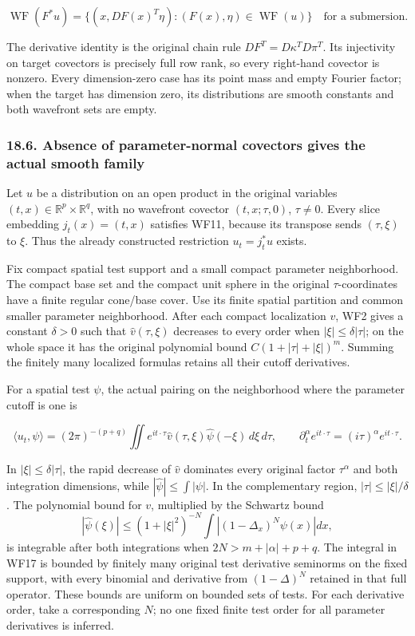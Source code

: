 \documentclass[
  11pt,
]{article}
\begin{document}
\[
\operatorname{WF}(F^*u)
 =\{(x,DF(x)^T\eta):(F(x),\eta)\in\operatorname{WF}(u)\}
 \quad\text{for a submersion}.
\tag{WF15}
\]

The derivative identity is the original chain rule
\(DF^T=D\kappa^T D\pi^T\). Its injectivity on target covectors is
precisely full row rank, so every right-hand covector is nonzero. Every
dimension-zero case has its point mass and empty Fourier factor; when
the target has dimension zero, its distributions are smooth constants
and both wavefront sets are empty.

\subsubsection{18.6. Absence of parameter-normal covectors gives the
actual smooth
family}\label{absence-of-parameter-normal-covectors-gives-the-actual-smooth-family}

Let \(u\) be a distribution on an open product in the original variables
\((t,x)\in\mathbb R^p\times\mathbb R^q\), with no wavefront covector
\((t,x;\tau,0)\), \(\tau\ne0\). Every slice embedding \(j_t(x)=(t,x)\)
satisfies WF11, because its transpose sends \((\tau,\xi)\) to \(\xi\).
Thus the already constructed restriction \(u_t=j_t^*u\) exists.

Fix compact spatial test support and a small compact parameter
neighborhood. The compact base set and the compact unit sphere in the
original \(\tau\)-coordinates have a finite regular cone/base cover. Use
its finite spatial partition and common smaller parameter neighborhood.
After each compact localization \(v\), WF2 gives a constant \(\delta>0\)
such that \(\widehat v(\tau,\xi)\) decreases to every order when
\(|\xi|\leq\delta|\tau|\); on the whole space it has the original
polynomial bound \(C(1+|\tau|+|\xi|)^m\). Summing the finitely many
localized formulas retains all their cutoff derivatives.

For a spatial test \(\psi\), the actual pairing on the neighborhood
where the parameter cutoff is one is

\[
\langle u_t,\psi\rangle
=(2\pi)^{-(p+q)}
 \iint e^{it\cdot\tau}\widehat v(\tau,\xi)\widehat\psi(-\xi)
                           \,d\xi\,d\tau,\qquad
\partial_t^\alpha e^{it\cdot\tau}=(i\tau)^\alpha e^{it\cdot\tau}.
\tag{WF16}
\]

In \(|\xi|\leq\delta|\tau|\), the rapid decrease of \(\widehat v\)
dominates every original factor \(\tau^\alpha\) and both integration
dimensions, while \(|\widehat\psi|\leq\int|\psi|\). In the complementary
region, \(|\tau|\leq|\xi|/\delta\). The polynomial bound for \(v\),
multiplied by the Schwartz bound \[
|\widehat\psi(\xi)|\leq
(1+|\xi|^2)^{-N}
\int |(1-\Delta_x)^N\psi(x)|dx,
\tag{WF17}
\] is integrable after both integrations when \(2N>m+|\alpha|+p+q\). The
integral in WF17 is bounded by finitely many original test derivative
seminorms on the fixed support, with every binomial and derivative from
\((1-\Delta)^N\) retained in that full operator. These bounds are
uniform on bounded sets of tests. For each derivative order, take a
corresponding \(N\); no one fixed finite test order for all parameter
derivatives is inferred.
\end{document}
